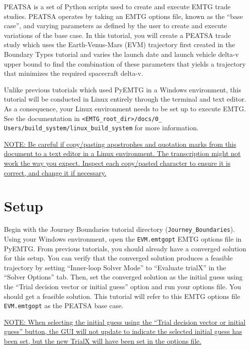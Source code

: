 \documentclass[11pt]{article}
\makeatletter
\newcommand{\knownissuelabel}[2]
{
	 \phantomsection
  	\hyperref[#2_h]{#1}\def\@currentlabel{\unexpanded{#1}}\label{#2_b}
}
\makeatother
\begin{document}
\noindent \ac{PEATSA} is a set of Python scripts used to create and execute \ac{EMTG} trade studies. \ac{PEATSA} operates by taking an \ac{EMTG} options file, known as the ``base case'', and varying parameters as defined by the user to create and execute variations of the base case. In this tutorial, you will create a \ac{PEATSA} trade study which uses the Earth-Venus-Mars (EVM) trajectory first created in the Boundary Types tutorial and varies the launch date and launch vehicle delta-v upper bound to find the combination of these parameters that yields a trajectory that minimizes the required spacecraft delta-v.

\noindent Unlike previous tutorials which used PyEMTG in a Windows environment, this tutorial will be conducted in Linux entirely through the terminal and text editor. As a consequence, your Linux environment needs to be set up to execute \ac{EMTG}. See the documentation in \texttt{<EMTG\_root\_dir>/docs/0\_ Users/build\_system/linux\_build\_system} for more information.

\noindent\knownissuelabel{NOTE: Be careful if copy/pasting apostrophes and quotation marks from this document to a text editor in a Linux environment. The transcription might not work the way you expect. Inspect each copy/pasted character to ensure it is correct, and change it if necessary.}{copy_paste_issue}

\section{Setup}
\label{sec:setup}

Begin with the Journey Boundaries tutorial directory (\texttt{Journey\_Boundaries}). Using your Windows environment, open the \texttt{EVM.emtgopt} \ac{EMTG} options file in PyEMTG. From previous tutorials, you should already have a converged solution for this setup. You can verify that the converged solution produces a feasible trajectory by setting ``Inner-loop Solver Mode'' to ``Evaluate trialX'' in the ``Solver Options'' tab. Then, set the converged solution as the initial guess using the ``Trial decision vector or initial guess'' option and run your options file. You should get a feasible solution. This tutorial will refer to this \ac{EMTG} options file \texttt{EVM.emtgopt} as the \ac{PEATSA} base case.

\noindent\knownissuelabel{NOTE: When selecting the initial guess using the ``Trial decision vector or initial guess'' button, the \acs{GUI} will not update to indicate the selected initial guess has been set, but the new TrialX will have been set in the options file.}{no_initial_guess_update_issue}
\end{document}
